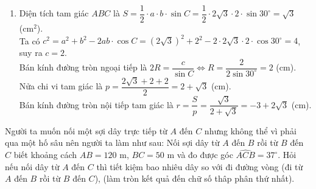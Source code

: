 \begin{bt}
{\begin{enumerate}
			Áp dụng định lý sin cho tam giác $ AHK $, ta có
			$$\dfrac{AK}{\sin\widehat{AHK}}=\dfrac{HK}{\sin\widehat{HAK}}\Leftrightarrow\dfrac{AK}{\sin 45^\circ}=\dfrac{380}{\sin 85^\circ}\Leftrightarrow AK\approx 270 \text{ m}. $$ 
			\item Diện tích tam giác $ ABC $ là $ S=\dfrac{1}{2}\cdot a\cdot b\cdot\sin C=\dfrac{1}{2}\cdot 2\sqrt{3}\cdot 2\cdot\sin 30^\circ=\sqrt{3}$ (cm$^2$).\\
			Ta có $ c^2=a^2+b^2-2ab\cdot\cos C=(2\sqrt{3})^2+2^2-2\cdot 2\sqrt{3}\cdot 2\cdot\cos 30^\circ=4 $, suy ra $ c=2 $.\\
			Bán kính đường tròn ngoại tiếp là $ 2R=\dfrac{c}{\sin C}\Leftrightarrow R=\dfrac{2}{2\sin 30^\circ}=2 $ (cm).\\
			Nửa chi vi tam giác là $ p=\dfrac{2\sqrt{3}+2+2}{2}=2+\sqrt{3}$ (cm).\\
			Bán kính đường tròn nội tiếp tam giác là $ r=\dfrac{S}{p}=\dfrac{\sqrt{3}}{2+\sqrt{3}}=-3+2\sqrt{3}$ (cm).
		\end{enumerate}
	}
\end{bt}

\begin{bt}%
 Người ta muốn nối một sợi dây trực tiếp từ $A$ đến $C$ nhưng không thể vì phải qua một hố sâu nên người ta làm như sau: Nối sợi dây từ $A$ đến $B$ rồi từ $B$ đến $C$ biết khoảng cách $AB=120$ m, $BC=50 $ m và đo được góc $\widehat{ACB}=37^{\circ}$. Hỏi nếu nối dây từ $A$ đến $C$ thì tiết kiệm bao nhiêu dây so với đi đường vòng (đi từ $A$ đến $B$ rồi từ $B$ đến $C$),
(làm tròn kết quả đến chữ số thâp phân thứ nhất).
\end{bt}

